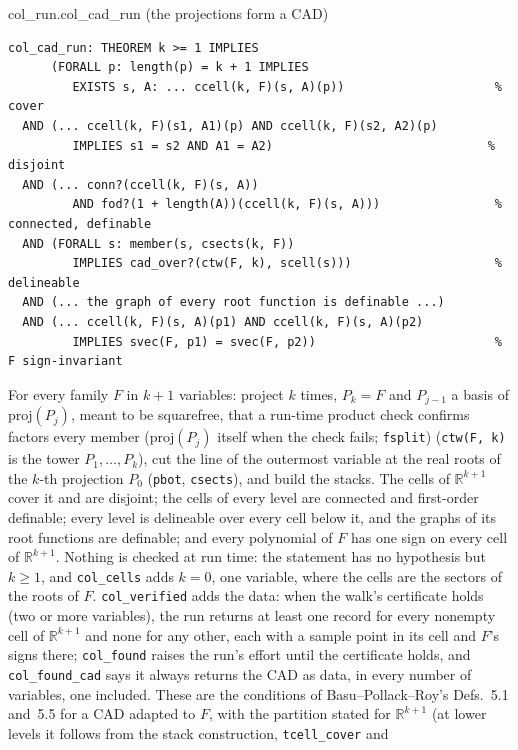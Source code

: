 \documentclass[11pt]{article}
\newcommand\code[1]{\mbox{\texttt{#1}}}
\begin{document}
\begin{thmbox}{col\_run.col\_cad\_run \quad (the projections form a CAD)}
\begin{Verbatim}[fontsize=\small]
col_cad_run: THEOREM k >= 1 IMPLIES
      (FORALL p: length(p) = k + 1 IMPLIES
         EXISTS s, A: ... ccell(k, F)(s, A)(p))                     % cover
  AND (... ccell(k, F)(s1, A1)(p) AND ccell(k, F)(s2, A2)(p)
         IMPLIES s1 = s2 AND A1 = A2)                              % disjoint
  AND (... conn?(ccell(k, F)(s, A))
         AND fod?(1 + length(A))(ccell(k, F)(s, A)))                % connected, definable
  AND (FORALL s: member(s, csects(k, F))
         IMPLIES cad_over?(ctw(F, k), scell(s)))                    % delineable
  AND (... the graph of every root function is definable ...)
  AND (... ccell(k, F)(s, A)(p1) AND ccell(k, F)(s, A)(p2)
         IMPLIES svec(F, p1) = svec(F, p2))                         % F sign-invariant
\end{Verbatim}
\end{thmbox}
For every family $F$ in $k+1$ variables: project $k$ times, $P_k = F$ and $P_{j-1}$ a basis of
$\mathrm{proj}(P_j)$, meant to be squarefree, that a run-time product check confirms factors every member
($\mathrm{proj}(P_j)$ itself when the check fails; \code{fsplit}) (\code{ctw(F, k)} is the tower $P_1, \dots, P_k$), cut the line of the outermost variable at the real roots of the
$k$-th projection $P_0$ (\code{pbot}, \code{csects}), and build the stacks. The cells of $\mathbb{R}^{k+1}$ cover it
and are disjoint; the cells of every level are connected and first-order definable; every level is delineable over
every cell below it, and the graphs of its root functions are definable; and every polynomial of $F$ has one sign
on every cell of $\mathbb{R}^{k+1}$. Nothing is checked at run time: the statement has no hypothesis but
$k \ge 1$, and \code{col\_cells} adds $k = 0$, one variable, where the cells are the sectors of the roots of $F$.
\code{col\_verified} adds the data: when the walk's certificate holds (two or more variables), the run returns at
least one record for every nonempty cell of $\mathbb{R}^{k+1}$ and none for any other, each with a sample point in
its cell and $F$'s signs there; \code{col\_found} raises the run's effort until the certificate holds, and
\code{col\_found\_cad} says it always returns the CAD as data, in every number of variables, one included. These
are the conditions of Basu--Pollack--Roy's Defs.~5.1 and~5.5 for a CAD adapted to $F$, with the partition stated for
$\mathbb{R}^{k+1}$ (at lower levels it follows from the stack construction, \code{tcell\_cover} and
\end{document}
